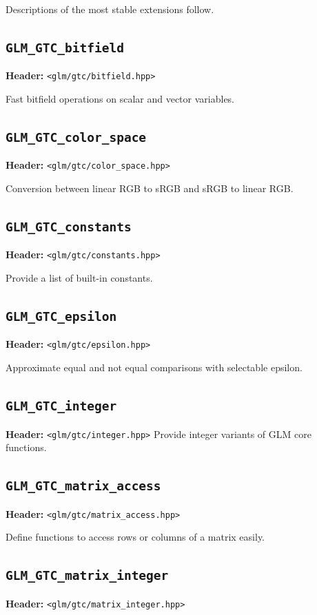 \documentclass{scrartcl}
\numberwithin{figure}{subsection}
\begin{document}
Descriptions of the most stable extensions follow.

\subsection{\texttt{GLM\_GTC\_bitfield}}
\textbf{Header:} \verb|<glm/gtc/bitfield.hpp>|

Fast bitfield operations on scalar and vector variables.

\subsection{\texttt{GLM\_GTC\_color\_space}}
\textbf{Header:} \verb|<glm/gtc/color_space.hpp>|

Conversion between linear RGB to sRGB and sRGB to linear RGB.

\subsection{\texttt{GLM\_GTC\_constants}}
\textbf{Header:} \verb|<glm/gtc/constants.hpp>|

Provide a list of built-in constants.

\subsection{\texttt{GLM\_GTC\_epsilon}}
\textbf{Header:} \verb|<glm/gtc/epsilon.hpp>|

Approximate equal and not equal comparisons with selectable epsilon.

\subsection{\texttt{GLM\_GTC\_integer}}
\textbf{Header:} \verb|<glm/gtc/integer.hpp>|
Provide integer variants of GLM core functions. 

\subsection{\texttt{GLM\_GTC\_matrix\_access}}
\textbf{Header:} \verb|<glm/gtc/matrix_access.hpp>|

Define functions to access rows or columns of a matrix easily.

\subsection{\texttt{GLM\_GTC\_matrix\_integer}}
\textbf{Header:} \verb|<glm/gtc/matrix_integer.hpp>|
\end{document}
